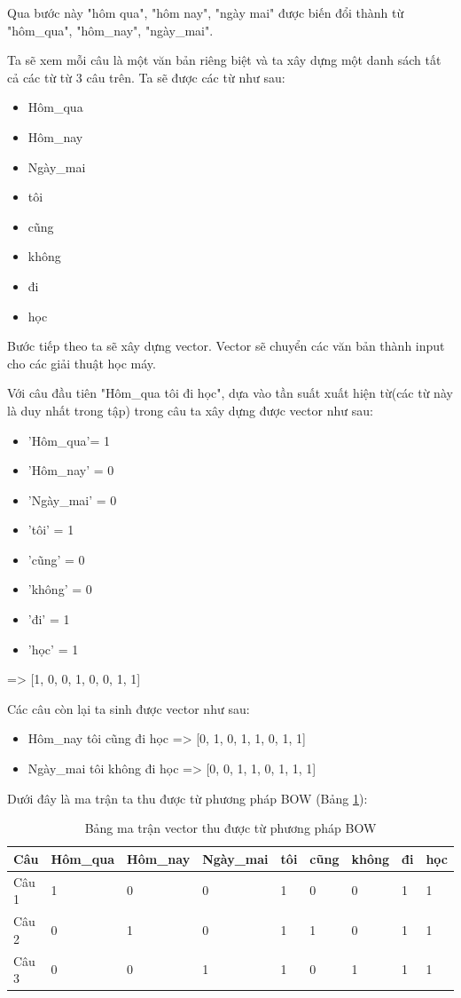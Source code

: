 Qua bước này "hôm qua", "hôm nay", "ngày mai" được biến đổi thành từ "hôm\_qua", "hôm\_nay", "ngày\_mai".

Ta sẽ xem mỗi câu là một văn bản riêng biệt và ta xây dựng một danh sách tất cả các từ từ 3 câu trên. Ta sẽ được các từ như sau:
\begin{itemize}
    \item Hôm\_qua
    \item Hôm\_nay
    \item Ngày\_mai
    \item tôi
    \item cũng
    \item không
    \item đi
    \item học
\end{itemize}

Bước tiếp theo ta sẽ xây dựng vector. Vector sẽ chuyển các văn bản thành input cho các giải thuật học máy.

Với câu đầu tiên "Hôm\_qua tôi đi học", dựa vào tần suất xuất hiện từ(các từ này là duy nhất trong tập) trong câu ta xây dựng được vector như sau:
\begin{itemize}
   \item 'Hôm\_qua'= 1
    \item 'Hôm\_nay' = 0
    \item 'Ngày\_mai' = 0
    \item 'tôi' = 1
    \item 'cũng' = 0
    \item 'không' = 0
    \item 'đi' = 1
    \item 'học' = 1
\end{itemize}

=> [1, 0, 0, 1, 0, 0, 1, 1]

Các câu còn lại ta sinh được vector như sau:
\begin{itemize}
    \item Hôm\_nay tôi cũng đi học => [0, 1, 0, 1, 1, 0, 1, 1]
    \item Ngày\_mai tôi không đi học => [0, 0, 1, 1, 0, 1, 1, 1]
\end{itemize}

Dưới đây là ma trận ta thu được từ phương pháp BOW (Bảng \ref{tab:bow_vector}):

\begin{table}[h!]
\centering
\begin{tabular}{|l|l|l|l|l|l|l|l|l|}
\hline
Câu & Hôm\_qua & Hôm\_nay   & Ngày\_mai & tôi    & cũng   & không   & đi   & học \\ \hline
Câu 1     & 1     & 0 & 0  & 1    & 0    & 0 & 1 & 1 \\ \hline
Câu 2     & 0     & 1    & 0  & 1 & 1 & 0    & 1    & 1    \\ \hline
Câu 3     & 0     & 0 & 1     & 1 & 0 & 1    & 1    & 1   \\ \hline
\end{tabular}
\caption{Bảng ma trận vector thu được từ phương pháp BOW}
\label{tab:bow_vector}
\end{table}

